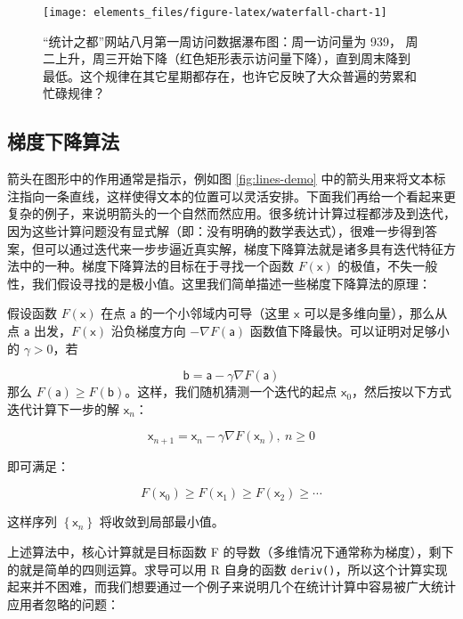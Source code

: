 \documentclass[
  b5paper,
  UTF8,twoside]{book}
\begin{document}
\begin{figure}

{\centering \texttt{[image: elements\_files/figure-latex/waterfall-chart-1]} 

}

\caption[``统计之都''网站八月第一周访问数据瀑布图]{``统计之都''网站八月第一周访问数据瀑布图：周一访问量为 939， 周二上升，周三开始下降（红色矩形表示访问量下降），直到周末降到最低。这个规律在其它星期都存在，也许它反映了大众普遍的劳累和忙碌规律？}\label{fig:waterfall-chart}
\end{figure}





\hypertarget{subsec:grad-desc}{%
\subsection{梯度下降算法}\label{subsec:grad-desc}}

箭头在图形中的作用通常是指示，例如图 \ref{fig:lines-demo} 中的箭头用来将文本标注指向一条直线，这样使得文本的位置可以灵活安排。下面我们再给一个看起来更复杂的例子，来说明箭头的一个自然而然应用。很多统计计算过程都涉及到迭代，因为这些计算问题没有显式解（即：没有明确的数学表达式），很难一步得到答案，但可以通过迭代来一步步逼近真实解，梯度下降算法就是诸多具有迭代特征方法中的一种。梯度下降算法的目标在于寻找一个函数 \(F(\mathsf{x})\) 的极值，不失一般性，我们假设寻找的是极小值。这里我们简单描述一些梯度下降算法的原理：

假设函数 \(F(\mathsf{x})\) 在点 \(\mathsf{a}\) 的一个小邻域内可导（这里 \(\mathsf{x}\) 可以是多维向量），那么从点 \(\mathsf{a}\) 出发，\(F(\mathsf{x})\) 沿负梯度方向 \(-\nabla F(\mathsf{a})\) 函数值下降最快。可以证明对足够小的 \(\gamma>0\)，若

\[\mathsf{b} = \mathsf{a}-\gamma\nabla F(\mathsf{a})\]
那么 \(F(\mathsf{a})\geq F(\mathsf{b})\)。这样，我们随机猜测一个迭代的起点 \(\mathsf{x}_{0}\)，然后按以下方式迭代计算下一步的解 \(\mathsf{x}_{n}\)：

\[\mathsf{x}_{n+1} = \mathsf{x}_{n}-\gamma\nabla F(\mathsf{x}_{n}),\ n\ge0\]

即可满足：

\[F(\mathsf{x}_{0})\ge F(\mathsf{x}_{1})\ge F(\mathsf{x}_{2})\ge\cdots\]

这样序列 \(\left\{ \mathsf{x}_{n}\right\}\) 将收敛到局部最小值。

上述算法中，核心计算就是目标函数 F 的导数（多维情况下通常称为梯度），剩下的就是简单的四则运算。求导可以用 R 自身的函数 \texttt{deriv()}，所以这个计算实现起来并不困难，而我们想要通过一个例子来说明几个在统计计算中容易被广大统计应用者忽略的问题：
\end{document}
